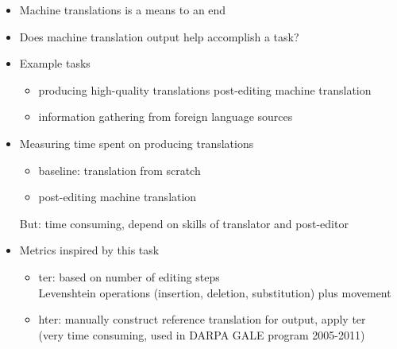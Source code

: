 \documentclass[landscape]{slides}
\begin{document}

\vspace{20mm}
\begin{itemize} \itemsep 10mm
\item Machine translations is a means to an end
\item Does machine translation output help accomplish a task?
\item Example tasks
\begin{itemize}
\item producing high-quality translations post-editing machine translation
\item information gathering from foreign language sources
\end{itemize}
\end{itemize}


\vspace{10mm}
\begin{itemize}
\item Measuring time spent on producing translations
\begin{itemize}
\item baseline: translation from scratch
\item post-editing machine translation
\end{itemize}
But: time consuming, depend on skills of translator and post-editor
\item Metrics inspired by this task
\begin{itemize}
\item {\sc ter}: based on number of editing steps\\
Levenshtein operations (insertion, deletion, substitution) plus movement
\vspace{3mm}
\item {\sc hter}: manually construct reference translation for output, apply {\sc ter}\\
(very time consuming, used in DARPA GALE program 2005-2011)
\end{itemize}
\end{itemize}

\end{document}
